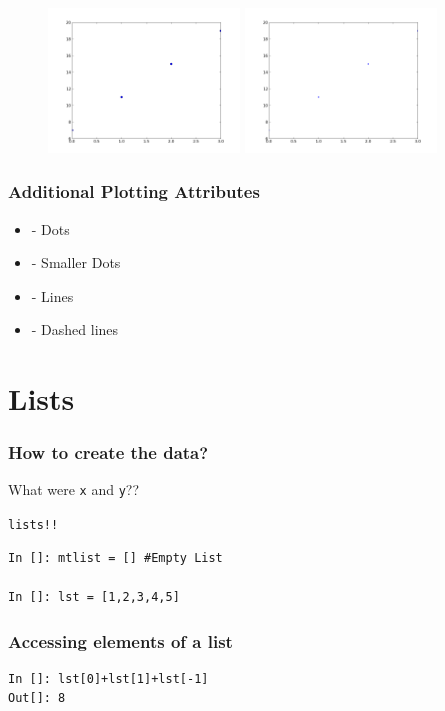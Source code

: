 \documentclass[14pt,compress]{beamer}
\newcommand{\typ}[1]{\lstinline{#1}}
\newcommand{\kwrd}[1]{ \texttt{\textbf{\color{blue}{#1}}}  }
\begin{document}
\begin{frame}[fragile]
\begin{figure}
\includegraphics[width=2in]{data/stline_dots.png}
\includegraphics[width=2in]{data/stline_points.png}
\end{figure}
\end{frame}

\begin{frame}[fragile]
\frametitle{Additional Plotting Attributes}
\begin{itemize}
  \item \kwrd{'o'} - Dots
  \item \kwrd{'.'} - Smaller Dots
  \item \kwrd{'-'} - Lines
  \item \kwrd{'- -'} - Dashed lines
\end{itemize}
\end{frame}

\section{Lists}
\begin{frame}[fragile]
  \frametitle{How to create the data?}
What were \typ{x} and \typ{y}??\\
\begin{center}
\alert{\typ{lists!!}}
\end{center}
\begin{lstlisting}
In []: mtlist = [] #Empty List

In []: lst = [1,2,3,4,5] 
\end{lstlisting}
\end{frame}

\begin{frame}[fragile]
\frametitle{Accessing elements of a list}
\begin{lstlisting}
In []: lst[0]+lst[1]+lst[-1]
Out[]: 8
\end{lstlisting}
\end{frame}
\end{document}
